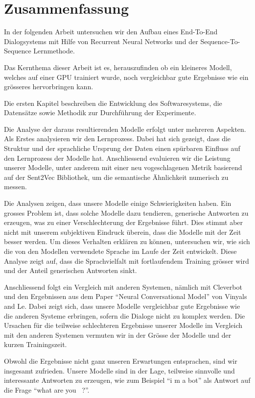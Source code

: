 \chapter*{Zusammenfassung}
In der folgenden Arbeit untersuchen wir den Aufbau eines End-To-End Dialogsystems mit Hilfe von Recurrent Neural Networks und der Sequence-To-Sequence Lernmethode.

Das Kernthema dieser Arbeit ist es, herauszufinden ob ein kleineres Modell, welches auf einer GPU trainiert wurde, noch vergleichbar gute Ergebnisse wie ein grösseres hervorbringen kann.

Die ersten Kapitel beschreiben die Entwicklung des Softwaresystems, die Datensätze sowie Methodik zur Durchführung der Experimente.

Die Analyse der daraus resultierenden Modelle erfolgt unter mehreren Aspekten. Als Erstes analysieren wir den Lernprozess. Dabei hat sich gezeigt, dass die Struktur und der sprachliche Ursprung der Daten einen spürbaren Einfluss auf den Lernprozess der Modelle hat. Anschliessend evaluieren wir die Leistung unserer Modelle, unter anderem mit einer neu vogeschlagenen Metrik basierend auf der Sent2Vec Bibliothek, um die semantische Ähnlichkeit numerisch zu messen.

Die Analysen zeigen, dass unsere Modelle einige Schwierigkeiten haben. Ein grosses Problem ist, dass solche Modelle dazu tendieren, generische Antworten zu erzeugen, was zu einer Verschlechterung der Ergebnisse führt. Dies stimmt aber nicht mit unserem subjektiven Eindruck überein, dass die Modelle mit der Zeit besser werden. Um dieses Verhalten erklären zu können, untersuchen wir, wie sich die von den Modellen verwendete Sprache im Laufe der Zeit entwickelt. Diese Analyse zeigt auf, dass die Sprachvielfalt mit fortlaufendem Training grösser wird und der Anteil generischen Antworten sinkt.

Anschliessend folgt ein Vergleich mit anderen Systemen, nämlich mit Cleverbot und den Ergebnissen aus dem Paper ``Neural Conversational Model'' von Vinyals and Le\cite{Vinyals:2015}. Dabei zeigt sich, dass unsere Modelle vergleichbar gute Ergebnisse wie die anderen Systeme erbringen, sofern die Dialoge nicht zu komplex werden. Die Ursachen für die teilweise schlechteren Ergebnisse unserer Modelle im Vergleich mit den anderen Systemen vermuten wir in der Grösse der Modelle und der kurzen Trainingszeit.

Obwohl die Ergebnisse nicht ganz unseren Erwartungen entsprachen, sind wir insgesamt zufrieden. Unsere Modelle sind in der Lage, teilweise sinnvolle und interessante Antworten zu erzeugen, wie zum Beispiel ``i m a bot'' als Antwort auf die Frage ``what are you~ ?''.
